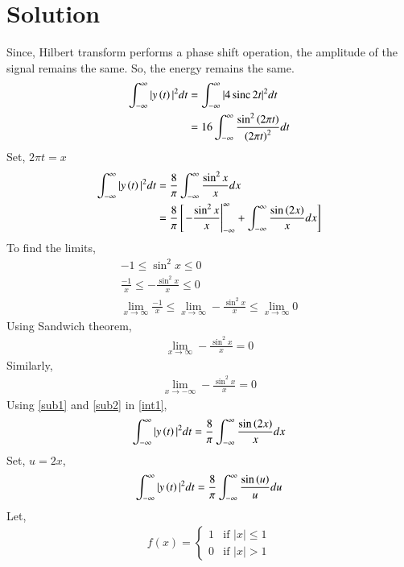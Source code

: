 \documentclass[journal,12pt,twocolumn]{IEEEtran}
\DeclareMathOperator{\sinc}{sinc}
\begin{document}
\section*{Solution}
Since, Hilbert transform performs a phase shift operation, the amplitude of the signal remains the same. So, the energy remains the same.
\begin{align}
    \int_{-\infty}^{\infty} |y\brak{t}|^2 dt &= \int_{-\infty}^{\infty} |4\sinc{2t}|^2 dt \\
    &= 16\int_{-\infty}^{\infty} \frac{\sin^2\brak{2\pi t}}{\brak{2\pi t}^2}dt\\
\end{align}
Set, $2\pi t = x$
\begin{align}
    \int_{-\infty}^{\infty} |y\left(t\right)|^2 dt &= \frac{8}{\pi} \int_{-\infty}^{\infty} \frac{\sin^2x}{x}dx\\
    &= \frac{8}{\pi}{}\left[\left.-\frac{\sin^2x}{x}\right\rvert_{-\infty}^{\infty} + \int_{-\infty}^{\infty} \frac{\sin\left(2x\right)}{x}dx\right] \label{int1}
\end{align}
To find the limits,
\begin{align}
    -1 \leq \sin^2x \leq 0\\
    \frac{-1}{x} \leq -\frac{\sin^2x}{x} \leq 0\\
    \lim_{x \to \infty}\frac{-1}{x} \leq \lim_{x \to \infty} -\frac{\sin^2x}{x} \leq \lim_{x \to \infty}0
\end{align}
Using Sandwich theorem,
\begin{align}
    \lim_{x \to \infty} -\frac{\sin^2x}{x} = 0 \label{sub1}
\end{align}
Similarly,
\begin{align}
    \lim_{x \to -\infty} -\frac{\sin^2x}{x} = 0 \label{sub2}
\end{align}
Using \eqref{sub1} and \eqref{sub2} in \eqref{int1},
\begin{align}
    \int_{-\infty}^{\infty} |y\left(t\right)|^2 dt = \frac{8}{\pi}\int_{-\infty}^{\infty} \frac{\sin\left(2x\right)}{x}dx
\end{align}
Set, $u = 2x$,
\begin{align}
    \int_{-\infty}^{\infty} |y\left(t\right)|^2 dt = \frac{8}{\pi}\int_{-\infty}^{\infty} \frac{\sin\left(u\right)}{u}du \label{int2}
\end{align}
Let,
\begin{align}
f(x) =
    \begin{cases}
        1 & \text{if } |x| \leq 1\\
        0 & \text{if } |x| > 1
    \end{cases}
\end{align}
\end{document}
